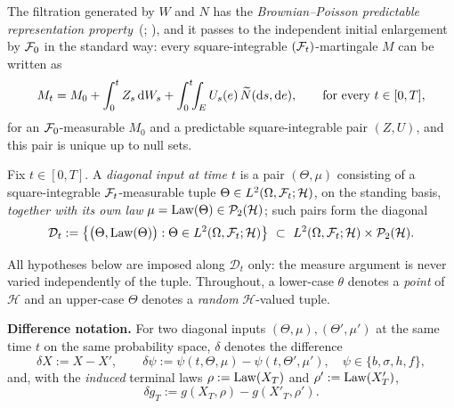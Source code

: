 The filtration generated by $W$ and $N$ has the \emph{Brownian--Poisson predictable
representation property}~(\cite[\S5.3]{Applebaum}; \cite[Theorem~13.49]{HeWangYan}), and it
passes to the independent initial enlargement by $\mathcal{F}_0$ in the standard way:
every square-integrable $(\mathcal{F}_t)$-martingale $M$ can be written as
\[
M_t=M_0+\int_0^t Z_s\,\mathrm{d} W_s+\int_0^t\!\!\int_E U_s(e)\,\widetilde{N}(\mathrm{d} s,\mathrm{d} e),
\qquad\text{for every }t\in[0,T],
\]
for an $\mathcal{F}_0$-measurable $M_0$ and a predictable square-integrable pair $(Z,U)$, and this
pair is unique up to null sets.

\begin{definition}\label{def:diag}
Fix $t\in[0,T]$. A \emph{diagonal input at time $t$} is a pair $(\Theta,\mu)$ consisting of a
square-integrable $\mathcal{F}_t$-measurable tuple $\Theta\in L^2(\Omega,\mathcal{F}_t;\mathcal H)$, on the
standing basis, \emph{together with its own law} $\mu=\mathrm{Law}(\Theta)\in\mathcal P_2(\mathcal H)$;
such pairs form the diagonal
\[
\mathcal D_t:=\bigl\{\bigl(\Theta,\mathrm{Law}(\Theta)\bigr):\Theta\in L^2(\Omega,\mathcal{F}_t;\mathcal H)\bigr\}
\ \subset\ L^2(\Omega,\mathcal{F}_t;\mathcal H)\times\mathcal P_2(\mathcal H).
\]
\end{definition}

\noindent All hypotheses below are imposed along $\mathcal D_t$ only: the measure argument is
never varied independently of the tuple. Throughout, a lower-case $\theta$ denotes a \emph{point} of
$\mathcal H$ and an upper-case $\Theta$ denotes a \emph{random} $\mathcal H$-valued tuple.

\smallskip\noindent\textbf{Difference notation.}
For two diagonal inputs $(\Theta,\mu),(\Theta',\mu')$ at the same time $t$ on the same
probability space, $\delta$ denotes the difference
\[
\delta X:=X-X',\qquad
\delta\psi:=\psi(t,\Theta,\mu)-\psi(t,\Theta',\mu'),\quad\psi\in\{b,\sigma,h,f\},
\]
and, with the \emph{induced} terminal laws $\rho:=\mathrm{Law}(X_T)$ and
$\rho':=\mathrm{Law}(X'_T)$,
\[
\delta g_T:=g(X_T,\rho)-g(X'_T,\rho') .
\]

